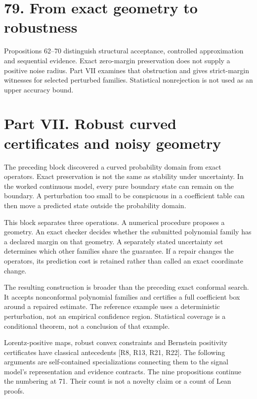 \documentclass[11pt,letterpaper]{article}
\begin{document}
\section{79. From exact geometry to
robustness}\label{from-exact-geometry-to-robustness}

Propositions 62--70 distinguish structural acceptance, controlled
approximation and sequential evidence. Exact zero-margin preservation
does not supply a positive noise radius. Part VII examines that
obstruction and gives strict-margin witnesses for selected perturbed
families. Statistical nonrejection is not used as an upper accuracy
bound.

\newpage

\section{Part VII. Robust curved certificates and noisy
geometry}\label{part-vii.-robust-curved-certificates-and-noisy-geometry}

The preceding block discovered a curved probability domain from exact
operators. Exact preservation is not the same as stability under
uncertainty. In the worked continuous model, every pure boundary state
can remain on the boundary. A perturbation too small to be conspicuous
in a coefficient table can then move a predicted state outside the
probability domain.

This block separates three operations. A numerical procedure proposes a
geometry. An exact checker decides whether the submitted polynomial
family has a declared margin on that geometry. A separately stated
uncertainty set determines which other families share the guarantee. If
a repair changes the operators, its prediction cost is retained rather
than called an exact coordinate change.

The resulting construction is broader than the preceding exact conformal
search. It accepts nonconformal polynomial families and certifies a full
coefficient box around a repaired estimate. The reference example uses a
deterministic perturbation, not an empirical confidence region.
Statistical coverage is a conditional theorem, not a conclusion of that
example.

Lorentz-positive maps, robust convex constraints and Bernstein
positivity certificates have classical antecedents {[}R8, R13, R21,
R22{]}. The following arguments are self-contained specializations
connecting them to the signal model's representation and evidence
contracts. The nine propositions continue the numbering at 71. Their
count is not a novelty claim or a count of Lean proofs.
\end{document}
